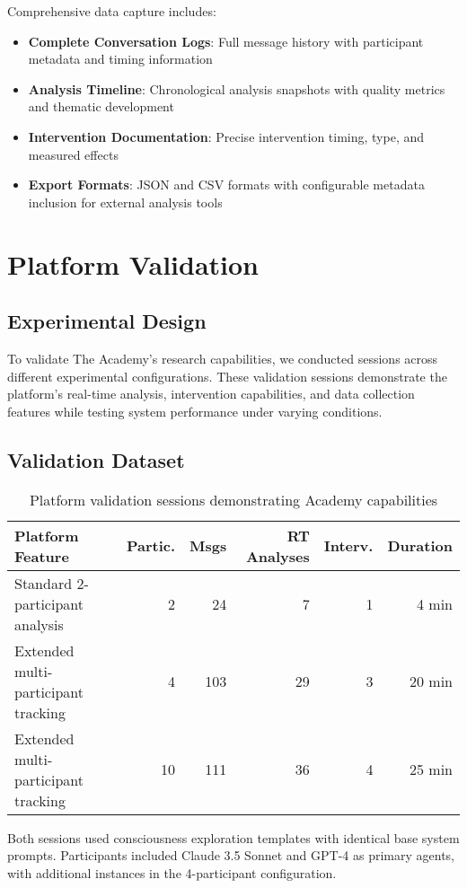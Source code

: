 \documentclass[11pt,letterpaper]{article}
\newcommand{\theacademy}{The Academy}
\begin{document}
Comprehensive data capture includes:

\begin{itemize}
    \item \textbf{Complete Conversation Logs}: Full message history with participant metadata and timing information
    \item \textbf{Analysis Timeline}: Chronological analysis snapshots with quality metrics and thematic development
    \item \textbf{Intervention Documentation}: Precise intervention timing, type, and measured effects
    \item \textbf{Export Formats}: JSON and CSV formats with configurable metadata inclusion for external analysis tools
\end{itemize}

\section{Platform Validation}

\subsection{Experimental Design}

To validate \theacademy{}'s research capabilities, we conducted sessions across different experimental configurations. These validation sessions demonstrate the platform's real-time analysis, intervention capabilities, and data collection features while testing system performance under varying conditions.

\subsection{Validation Dataset}

\begin{table}[h]
\centering
\begin{tabular}{lrrrrr}
\toprule
\textbf{Platform Feature} & \textbf{Partic.} & \textbf{Msgs} & \textbf{RT Analyses} & \textbf{Interv.} & \textbf{Duration} \\
\midrule
Standard 2-participant analysis & 2 & 24 & 7 & 1 & 4 min \\
Extended multi-participant tracking & 4 & 103 & 29 & 3 & 20 min \\
Extended multi-participant tracking & 10 & 111 & 36 & 4 & 25 min \\
\bottomrule
\end{tabular}
\caption{Platform validation sessions demonstrating Academy capabilities}
\label{tab:platform_validation}
\end{table}
Both sessions used consciousness exploration templates with identical base system prompts. Participants included Claude 3.5 Sonnet and GPT-4 as primary agents, with additional instances in the 4-participant configuration.
\end{document}
